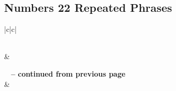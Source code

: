 \subsection{Numbers 22 Repeated Phrases}


\normalsize
 
\begin{center}
\begin{longtable}{|c|c|}
\caption[Numbers 22 Repeated Phrases]{Numbers 22 Repeated Phrases}\label{table:Repeated Phrases Numbers 22} \\
\hline {} &  \\ \hline 
\endfirsthead
 
{{\bfseries \tablename\ \thetable{} -- continued from previous page}} \\  
\hline {} &  \\ \hline 
\endhead
 

\end{longtable}
\end{center}
